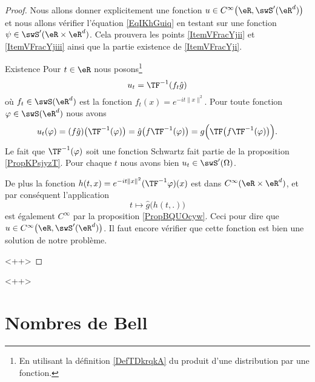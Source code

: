 \begin{proof}
    Nous allons donner explicitement une fonction \( u\in C^{\infty}\big( \eR,\swS'(\eR^d) \big)\) et nous allons vérifier l'équation \eqref{EqIKhGuiq} en testant sur une fonction \( \psi\in\swS'(\eR\times \eR^d)\). Cela prouvera les points \ref{ItemVFracYjii} et \ref{ItemVFracYjiii} ainsi que la partie existence de \ref{ItemVFracYji}.

    \begin{subproof}
    \item[Existence]
        Pour \( t\in \eR\) nous posons\footnote{En utilisant la définition \eqref{DefTDkrqkA} du produit d'une distribution par une fonction.}
        \begin{equation}
            u_t=\TF^{-1}(f_t\hat g)
        \end{equation}
        où \( f_t\in\swS(\eR^d)\) est la fonction \( f_t(x)= e^{-it\| x \|^2}\). Pour toute fonction \( \varphi\in\swS(\eR^d)\) nous avons
        \begin{equation}
            u_t(\varphi)=(f\hat g)\big( \TF^{-1}(\varphi) \big)=\hat g\big( f\TF^{-1}(\varphi) \big)=g\Big( \TF\big( f\TF^{-1}(\varphi) \big) \Big).
        \end{equation}
        Le fait que \( \TF^{-1}(\varphi)\) soit une fonction Schwartz fait partie de la proposition \ref{PropKPsjyzT}. Pour chaque \( t\) nous avons bien \( u_t\in\swS'(\Omega)\).

        De plus la fonction \( h(t,x)= e^{-it\| x \|^2}(\TF^{-1}\varphi)(x)\) est dans \(  C^{\infty}(\eR\times \eR^d)\), et par conséquent l'application
        \begin{equation}
            t\mapsto \hat g\big( h(t,.) \big)
        \end{equation}
        est également \(  C^{\infty}\) par la proposition \ref{PropBQUOcyw}. Ceci pour dire que \( u\in C^{\infty}\big( \eR,\swS'(\eR^d) \big)\). Il faut encore vérifier que cette fonction est bien une solution de notre problème.
    \end{subproof}
    <++>
\end{proof}
<++>

\section{Nombres de Bell}


